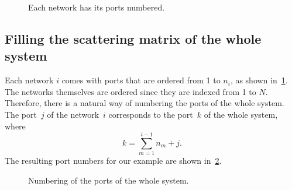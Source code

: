 \begin{figure}[b]
    \centering
    
    \caption{Each network has its ports numbered.}
    \label{fig:implementation_1}
\end{figure}




\subsection{Filling the scattering matrix of the whole system}

Each network $i$ comes with ports that are ordered from 1 to $n_i$, as shown in~\cref{fig:implementation_1}.
The networks themselves are ordered since they are indexed from 1 to $N$.
Therefore, there is a natural way of numbering the ports of the whole system.
The port~$j$ of the network~$i$ corresponds to the port~$k$ of the whole system, where
\begin{equation}
    k = \sum_{m=1}^{i - 1}n_m + j\text{.} \label{eq:port_numbering}
\end{equation}
The resulting port numbers for our example are shown in~\cref{fig:implementation_2}.

\begin{figure}[b]
    \centering
    
    \caption{Numbering of the ports of the whole system.}
    \label{fig:implementation_2}
\end{figure}

